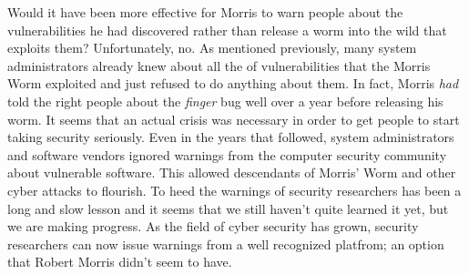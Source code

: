Would it have been more effective for Morris to warn people about the
vulnerabilities he had discovered rather than release a worm into the wild that
exploits them? Unfortunately, no. As mentioned previously, many system
administrators already knew about all the of vulnerabilities that the Morris
Worm exploited and just refused to do anything about them. In fact, Morris
\textit{had} told the right people about the \textit{finger} bug well over a
year before releasing his worm. It seems that an actual crisis was necessary in
order to get people to start taking security seriously. Even in the years that
followed, system administrators and software vendors ignored warnings from the
computer security community about vulnerable software. This allowed
descendants of Morris' Worm and other cyber attacks to flourish. To heed the
warnings of security researchers has been a long and slow lesson and it seems
that we still haven't quite learned it yet, but we are making progress. As the
field of cyber security has grown, security researchers can now issue warnings
from a well recognized platfrom; an option that Robert Morris didn't seem to
have.
